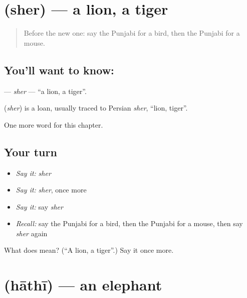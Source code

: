 \section[\texorpdfstring{\pa{ਸ਼ੇਰ} (sher)}{ਸ਼ੇਰ (sher)}]{ (sher) — a lion, a tiger}

\label{lesson:PA-C78-sher}



\begin{quote}
Before the new one: say the Punjabi for a bird, then the Punjabi for a mouse.
\end{quote}

\subsection*{You'll want to know: }
\textbf{} — \emph{sher} — \textquotedblleft{}a lion, a tiger\textquotedblright{}.

\begin{cousinweb}
\textbf{} (\emph{sher}) is a loan, usually traced to Persian \emph{sher}, \textquotedblleft{}lion, tiger\textquotedblright{}.
\end{cousinweb}

\begin{grammarlens}[title={What you've built}]
One more word for this chapter.
\end{grammarlens}

\subsection*{Your turn}
\begin{itemize}
\raggedright
  \item \emph{Say it:} \emph{sher}
  \item \emph{Say it:} \emph{sher}, once more
  \item \emph{Say it:} say \emph{sher}
  \item \emph{Recall:} say the Punjabi for a bird, then the Punjabi for a mouse, then say \emph{sher} again
\end{itemize}

\begin{tcolorbox}[breakable,colback=teal!4,colframe=teal!35!black,title={Before you move on}]
What does  mean? (\textquotedblleft{}A lion, a tiger\textquotedblright{}.) Say it once more.
\end{tcolorbox}
\section[\texorpdfstring{\pa{ਹਾਥੀ} (hāthī)}{ਹਾਥੀ (hāthī)}]{ (hāthī) — an elephant}

